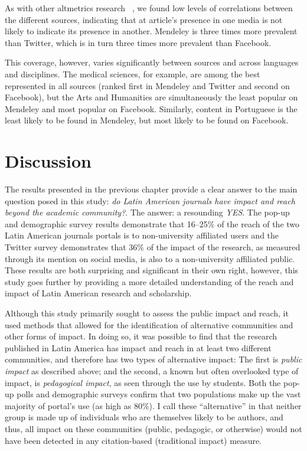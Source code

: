 As with other altmetrics research ~\citep{Haustein2014a,Shema2014}, we found low levels of correlations between the different sources, indicating that at article's presence in one media is not likely to indicate its presence in another. Mendeley is three times more prevalent than Twitter, which is in turn three times more prevalent than Facebook.

This coverage, however, varies significantly between sources and across languages and disciplines. The medical sciences, for example, are among the best represented in all sources (ranked first in Mendeley and Twitter and second on Facebook), but the Arts and Humanities are simultaneously the least popular on Mendeley and most popular on Facebook. Similarly, content in Portuguese is the least likely to be found in Mendeley, but most likely to be found on Facebook.

\chapter{Discussion}
\label{discussion}

The results presented in the previous chapter provide a clear answer to the main question posed in this study: \emph{do Latin American journals have impact and reach beyond the academic community?}. The answer: a resounding \emph{YES}. The pop-up and demographic survey results demonstrate that 16--25\% of the reach of the two Latin American journals portals is to non-university affiliated users and the Twitter survey demonstrates that 36\% of the impact of the research, as measured through its mention on social media, is also to a non-university affiliated public. These results are both surprising and significant in their own right, however, this study goes further by providing a more detailed understanding of the reach and impact of Latin American research and scholarship.

Although this study primarily sought to assess the public impact and reach, it used methods that allowed for the identification of alternative communities and other forms of impact. In doing so, it was possible to find that the research published in Latin America has impact and reach in at least two different communities, and therefore has two types of alternative impact: The first is \emph{public impact} as described above; and the second, a known but often overlooked type of impact, is \emph{pedagogical impact}, as seen through the use by students. Both the pop-up polls and demographic surveys confirm that two populations make up the vast majority of portal's use (as high as 80\%). I call these ``alternative'' in that neither group is made up of individuals who are themselves likely to be authors, and thus, all impact on these communities (public, pedagogic, or otherwise) would not have been detected in any citation-based (traditional impact) measure.

